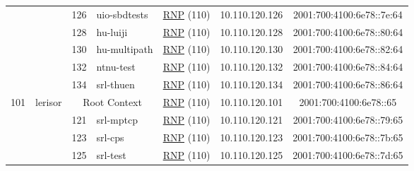 \begin{small}
\begin{center}
\begin{longtable}{|c|c|c|c|c|c|c|c|}
  &  & \tiny{126} & \multicolumn{1}{|l|}{\tiny{uio-sbdtests}} & \multicolumn{2}{|c|}{\tiny{\href{https://www.rnp.br}{RNP} (110)}} & \tiny{10.110.120.126} & \tiny{2001:700:4100:6e78::7e:64} \\* \cline{3-3}\cline{4-4}\cline{5-5}\cline{6-6}\cline{7-7}\cline{8-8}
  &  & \tiny{128} & \multicolumn{1}{|l|}{\tiny{hu-luiji}} & \multicolumn{2}{|c|}{\tiny{\href{https://www.rnp.br}{RNP} (110)}} & \tiny{10.110.120.128} & \tiny{2001:700:4100:6e78::80:64} \\* \cline{3-3}\cline{4-4}\cline{5-5}\cline{6-6}\cline{7-7}\cline{8-8}
  &  & \tiny{130} & \multicolumn{1}{|l|}{\tiny{hu-multipath}} & \multicolumn{2}{|c|}{\tiny{\href{https://www.rnp.br}{RNP} (110)}} & \tiny{10.110.120.130} & \tiny{2001:700:4100:6e78::82:64} \\* \cline{3-3}\cline{4-4}\cline{5-5}\cline{6-6}\cline{7-7}\cline{8-8}
  &  & \tiny{132} & \multicolumn{1}{|l|}{\tiny{ntnu-test}} & \multicolumn{2}{|c|}{\tiny{\href{https://www.rnp.br}{RNP} (110)}} & \tiny{10.110.120.132} & \tiny{2001:700:4100:6e78::84:64} \\* \cline{3-3}\cline{4-4}\cline{5-5}\cline{6-6}\cline{7-7}\cline{8-8}
  &  & \tiny{134} & \multicolumn{1}{|l|}{\tiny{srl-thuen}} & \multicolumn{2}{|c|}{\tiny{\href{https://www.rnp.br}{RNP} (110)}} & \tiny{10.110.120.134} & \tiny{2001:700:4100:6e78::86:64} \\ \hline
 \multirow{9}{*}{\tiny{101}} & \multicolumn{1}{|l|}{\multirow{9}{*}{\tiny{lerisor}}} & \multicolumn{2}{|c|}{\tiny{Root Context}} & \multicolumn{2}{|c|}{\tiny{\href{https://www.rnp.br}{RNP} (110)}} & \tiny{10.110.120.101} & \tiny{2001:700:4100:6e78::65} \\* \cline{3-3}\cline{4-4}\cline{5-5}\cline{6-6}\cline{7-7}\cline{8-8}
  &  & \tiny{121} & \multicolumn{1}{|l|}{\tiny{srl-mptcp}} & \multicolumn{2}{|c|}{\tiny{\href{https://www.rnp.br}{RNP} (110)}} & \tiny{10.110.120.121} & \tiny{2001:700:4100:6e78::79:65} \\* \cline{3-3}\cline{4-4}\cline{5-5}\cline{6-6}\cline{7-7}\cline{8-8}
  &  & \tiny{123} & \multicolumn{1}{|l|}{\tiny{srl-cps}} & \multicolumn{2}{|c|}{\tiny{\href{https://www.rnp.br}{RNP} (110)}} & \tiny{10.110.120.123} & \tiny{2001:700:4100:6e78::7b:65} \\* \cline{3-3}\cline{4-4}\cline{5-5}\cline{6-6}\cline{7-7}\cline{8-8}
  &  & \tiny{125} & \multicolumn{1}{|l|}{\tiny{srl-test}} & \multicolumn{2}{|c|}{\tiny{\href{https://www.rnp.br}{RNP} (110)}} & \tiny{10.110.120.125} & \tiny{2001:700:4100:6e78::7d:65} \\* \cline{3-3}\cline{4-4}\cline{5-5}\cline{6-6}\cline{7-7}\cline{8-8}

\end{longtable}
\end{center}
\end{small}
